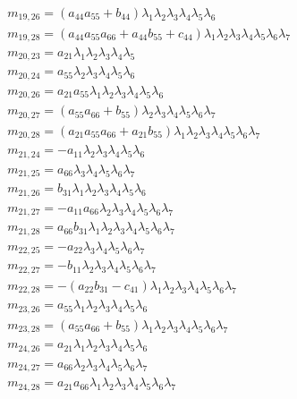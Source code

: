 \documentclass{article}
\begin{document}
\begin{align*}
&m_{19,26}={\left(a_{44} a_{55} + b_{44}\right)} \lambda_{1} \lambda_{2} \lambda_{3} \lambda_{4} \lambda_{5} \lambda_{6}\\
&m_{19,28}={\left(a_{44} a_{55} a_{66} + a_{44} b_{55} + c_{44}\right)} \lambda_{1} \lambda_{2} \lambda_{3} \lambda_{4} \lambda_{5} \lambda_{6} \lambda_{7}\\
&m_{20,23}=a_{21} \lambda_{1} \lambda_{2} \lambda_{3} \lambda_{4} \lambda_{5}\\
&m_{20,24}=a_{55} \lambda_{2} \lambda_{3} \lambda_{4} \lambda_{5} \lambda_{6}\\
&m_{20,26}=a_{21} a_{55} \lambda_{1} \lambda_{2} \lambda_{3} \lambda_{4} \lambda_{5} \lambda_{6}\\
&m_{20,27}={\left(a_{55} a_{66} + b_{55}\right)} \lambda_{2} \lambda_{3} \lambda_{4} \lambda_{5} \lambda_{6} \lambda_{7}\\
&m_{20,28}={\left(a_{21} a_{55} a_{66} + a_{21} b_{55}\right)} \lambda_{1} \lambda_{2} \lambda_{3} \lambda_{4} \lambda_{5} \lambda_{6} \lambda_{7}\\
&m_{21,24}=-a_{11} \lambda_{2} \lambda_{3} \lambda_{4} \lambda_{5} \lambda_{6}\\
&m_{21,25}=a_{66} \lambda_{3} \lambda_{4} \lambda_{5} \lambda_{6} \lambda_{7}\\
&m_{21,26}=b_{31} \lambda_{1} \lambda_{2} \lambda_{3} \lambda_{4} \lambda_{5} \lambda_{6}\\
&m_{21,27}=-a_{11} a_{66} \lambda_{2} \lambda_{3} \lambda_{4} \lambda_{5} \lambda_{6} \lambda_{7}\\
&m_{21,28}=a_{66} b_{31} \lambda_{1} \lambda_{2} \lambda_{3} \lambda_{4} \lambda_{5} \lambda_{6} \lambda_{7}\\
&m_{22,25}=-a_{22} \lambda_{3} \lambda_{4} \lambda_{5} \lambda_{6} \lambda_{7}\\
&m_{22,27}=-b_{11} \lambda_{2} \lambda_{3} \lambda_{4} \lambda_{5} \lambda_{6} \lambda_{7}\\
&m_{22,28}=-{\left(a_{22} b_{31} - c_{41}\right)} \lambda_{1} \lambda_{2} \lambda_{3} \lambda_{4} \lambda_{5} \lambda_{6} \lambda_{7}\\
&m_{23,26}=a_{55} \lambda_{1} \lambda_{2} \lambda_{3} \lambda_{4} \lambda_{5} \lambda_{6}\\
&m_{23,28}={\left(a_{55} a_{66} + b_{55}\right)} \lambda_{1} \lambda_{2} \lambda_{3} \lambda_{4} \lambda_{5} \lambda_{6} \lambda_{7}\\
&m_{24,26}=a_{21} \lambda_{1} \lambda_{2} \lambda_{3} \lambda_{4} \lambda_{5} \lambda_{6}\\
&m_{24,27}=a_{66} \lambda_{2} \lambda_{3} \lambda_{4} \lambda_{5} \lambda_{6} \lambda_{7}\\
&m_{24,28}=a_{21} a_{66} \lambda_{1} \lambda_{2} \lambda_{3} \lambda_{4} \lambda_{5} \lambda_{6} \lambda_{7}\\
\end{align*}
\end{document}
